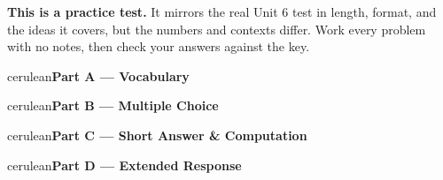 \documentclass[10pt]{article}
\newcommand{\parthead}[1]{%
  \vspace{6pt}\noindent
  \begin{headlinebox}{cerulean}{\color{white}\bfseries #1}\end{headlinebox}%
  \vspace{4pt}}
\begin{document}
\namedateperiod

\vspace{0.10in}
\begin{remindbox}
\small
\textbf{This is a practice test.} It mirrors the real Unit 6 test in length, format,
and the ideas it covers, but the numbers and contexts differ. Work every problem
with no notes, then check your answers against the key.
\end{remindbox}

\parthead{Part A --- Vocabulary}

\parthead{Part B --- Multiple Choice}

\parthead{Part C --- Short Answer \& Computation}

\parthead{Part D --- Extended Response}
\end{document}
